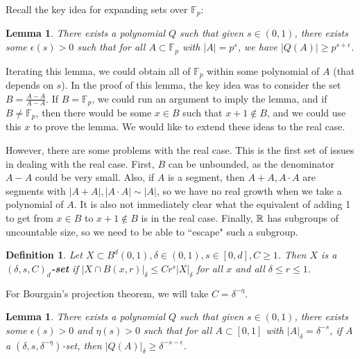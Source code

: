 \documentclass[12pt]{amsart}
\newtheorem{lemma}[theorem]{Lemma}
\newtheorem{Definition}[theorem]{Definition}
\newcommand{\F}{\mathbb{F}}
\newcommand{\eps}{\epsilon}
\begin{document}
Recall the key idea for expanding sets over $\F_p$:

\begin{lemma}
    There exists a polynomial $Q$ such that given $s\in(0,1)$, there exists some $\eps(s)>0$ such that for all $A\subset\F_p$ with $|A|=p^s$, we have $|Q(A)|\geq p^{s+\eps}$.
\end{lemma}

Iterating this lemma, we could obtain all of $\F_p$ within some polynomial of $A$ (that depends on $s$). In the proof of this lemma, the key idea was to consider the set $B=\frac{A-A}{A-A}$. If $B=\F_p$, we could run an argument to imply the lemma, and if $B\neq\F_p$, then there would be some $x\in B$ such that $x+1\not\in B$, and we could use this $x$ to prove the lemma. We would like to extend these ideas to the real case.

However, there are some problems with the real case.   This is the first set of issues in dealing with the real case.   First, $B$ can be unbounded, as the denominator $A-A$ could be very small. Also, if $A$ is a segment, then $A+A,A\cdot A$ are segments with $|A+A|,|A\cdot A|\sim |A|$, so we have no real growth when we take a polynomial of $A$. It is also not immediately clear what the equivalent of adding 1 to get from $x\in B$ to $x+1\not\in B$ is in the real case. Finally, $\mathbb{R}$ has subgroups of uncountable size, so we need to be able to ``escape" such a subgroup.

\begin{Definition}
    Let $X\subset B^d(0,1),\delta\in(0,1),s\in[0,d],C\geq 1$. Then $X$ is a \textbf{$(\delta,s,C)_d$-set} if $|X\cap B(x,r)|_\delta\leq Cr^s|X|_\delta$ for all $x$ and all $\delta\leq r\leq 1$.
\end{Definition}

For Bourgain's projection theorem, we will take $C=\delta^{-\eta}$.

\begin{lemma} \label{Qexpandweak}
    There exists a polynomial $Q$ such that given $s\in(0,1)$, there exists some $\eps(s)>0$ and $\eta(s) > 0$ such that for all $A\subset[0,1]$ with $|A|_\delta=\delta^{-s}$, if $A$ a $(\delta,s,\delta^{-\eta})$-set, then $|Q(A)|_\delta\geq\delta^{-s-\eps}$.
\end{lemma}
\end{document}
